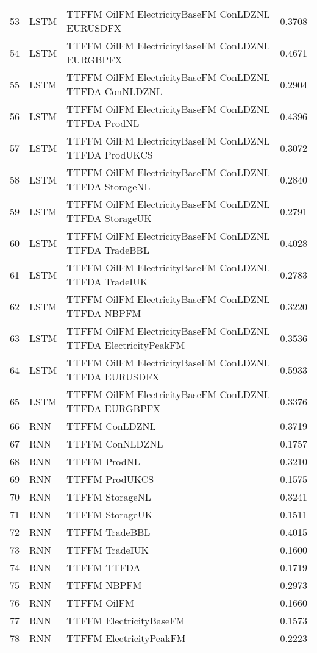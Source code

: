 \begin{table}[ht]
\begin{tabular}{rllr}
  53 & LSTM & TTFFM OilFM ElectricityBaseFM ConLDZNL EURUSDFX & 0.3708 \\ 
  54 & LSTM & TTFFM OilFM ElectricityBaseFM ConLDZNL EURGBPFX & 0.4671 \\ 
  55 & LSTM & TTFFM OilFM ElectricityBaseFM ConLDZNL TTFDA ConNLDZNL & 0.2904 \\ 
  56 & LSTM & TTFFM OilFM ElectricityBaseFM ConLDZNL TTFDA ProdNL & 0.4396 \\ 
  57 & LSTM & TTFFM OilFM ElectricityBaseFM ConLDZNL TTFDA ProdUKCS & 0.3072 \\ 
  58 & LSTM & TTFFM OilFM ElectricityBaseFM ConLDZNL TTFDA StorageNL & 0.2840 \\ 
  59 & LSTM & TTFFM OilFM ElectricityBaseFM ConLDZNL TTFDA StorageUK & 0.2791 \\ 
  60 & LSTM & TTFFM OilFM ElectricityBaseFM ConLDZNL TTFDA TradeBBL & 0.4028 \\ 
  61 & LSTM & TTFFM OilFM ElectricityBaseFM ConLDZNL TTFDA TradeIUK & 0.2783 \\ 
  62 & LSTM & TTFFM OilFM ElectricityBaseFM ConLDZNL TTFDA NBPFM & 0.3220 \\ 
  63 & LSTM & TTFFM OilFM ElectricityBaseFM ConLDZNL TTFDA ElectricityPeakFM & 0.3536 \\ 
  64 & LSTM & TTFFM OilFM ElectricityBaseFM ConLDZNL TTFDA EURUSDFX & 0.5933 \\ 
  65 & LSTM & TTFFM OilFM ElectricityBaseFM ConLDZNL TTFDA EURGBPFX & 0.3376 \\ 
  66 & RNN & TTFFM ConLDZNL & 0.3719 \\ 
  67 & RNN & TTFFM ConNLDZNL & 0.1757 \\ 
  68 & RNN & TTFFM ProdNL & 0.3210 \\ 
  69 & RNN & TTFFM ProdUKCS & 0.1575 \\ 
  70 & RNN & TTFFM StorageNL & 0.3241 \\ 
  71 & RNN & TTFFM StorageUK & 0.1511 \\ 
  72 & RNN & TTFFM TradeBBL & 0.4015 \\ 
  73 & RNN & TTFFM TradeIUK & 0.1600 \\ 
  74 & RNN & TTFFM TTFDA & 0.1719 \\ 
  75 & RNN & TTFFM NBPFM & 0.2973 \\ 
  76 & RNN & TTFFM OilFM & 0.1660 \\ 
  77 & RNN & TTFFM ElectricityBaseFM & 0.1573 \\ 
  78 & RNN & TTFFM ElectricityPeakFM & 0.2223 \\ 

\end{tabular}
\end{table}
